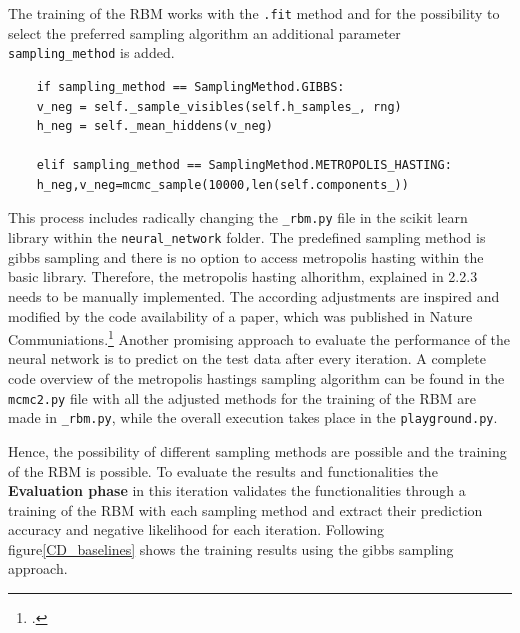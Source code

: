 The training of the \ac{RBM} works with the 
\texttt{.fit} method and for the possibility to select the preferred sampling algorithm 
an additional parameter \texttt{sampling\_method} is added. 
\begin{lstlisting}
    if sampling_method == SamplingMethod.GIBBS:
    v_neg = self._sample_visibles(self.h_samples_, rng)
    h_neg = self._mean_hiddens(v_neg)
    
    elif sampling_method == SamplingMethod.METROPOLIS_HASTING:
    h_neg,v_neg=mcmc_sample(10000,len(self.components_))
\end{lstlisting}
This process includes radically changing the \texttt{\_rbm.py} file in the scikit learn library within the \texttt{neural\_network} folder.
The predefined sampling method is gibbs sampling and there is no option to access metropolis hasting within the basic library. 
Therefore, the metropolis hasting alhorithm, explained in 2.2.3 needs to be manually implemented.
The according adjustments are inspired and modified by the code availability of a paper, which was published in Nature Communiations.\footcite[cf.][11-12]{bohmNoiseinjectedAnalogIsing2022}
Another promising approach to evaluate the performance of the neural network is to predict on the test data after every iteration.
A complete code overview of the metropolis hastings sampling algorithm can be found in the \texttt{mcmc2.py} file with all
the adjusted methods for the training of the \ac{RBM} are made in \texttt{\_rbm.py}, while the overall execution takes place in the \texttt{playground.py}.

Hence, the possibility of different sampling methods are possible and the training of the \ac{RBM} is possible.
To evaluate the results and functionalities the \textbf{Evaluation phase} in this iteration validates the functionalities through a training of the \ac{RBM} with each sampling method and extract their prediction accuracy 
and negative likelihood for each iteration. Following figure\ref{CD_baselines} shows the training results using the gibbs sampling approach. 


